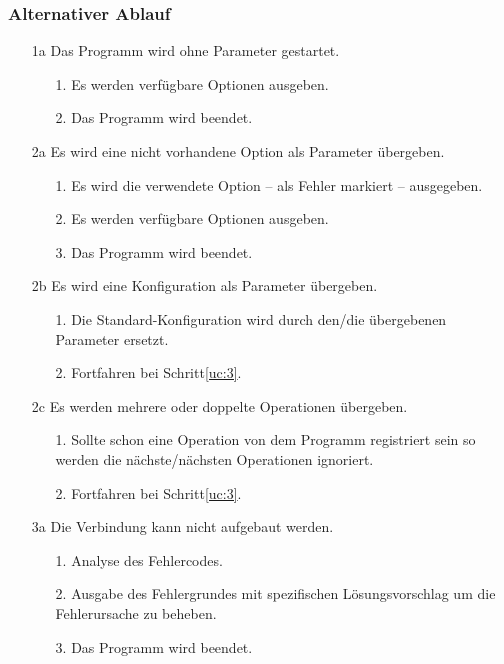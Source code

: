 \documentclass[Bachelorarbeit.tex]{subfiles}
\begin{document}
\subsubsection*{Alternativer Ablauf }
\begin{enumerate} %
\item[1a] Das Programm wird ohne Parameter gestartet.
\begin{enumerate}
\itemsep0em
\item[1.] Es werden verfügbare Optionen ausgeben.
\item[2.] Das Programm wird beendet.
\end{enumerate}
%
\item[2a] Es wird eine nicht vorhandene Option als Parameter übergeben.
\begin{enumerate}
\itemsep0em
\item[1.] Es wird die verwendete Option – als Fehler markiert – ausgegeben.
\item[2.] Es werden verfügbare Optionen ausgeben.
\item[3.] Das Programm wird beendet.
\end{enumerate}
%
\item[2b] Es wird eine Konfiguration als Parameter übergeben.
\begin{enumerate}
\itemsep0em
\item[1.] Die Standard-Konfiguration wird durch den/die übergebenen Parameter 
ersetzt.
\item[2.] Fortfahren bei Schritt\ref{uc:3}.
\end{enumerate}
%
\item[2c] Es werden mehrere oder doppelte Operationen übergeben.
\begin{enumerate}
\itemsep0em
\item[1.] Sollte schon eine Operation von dem Programm registriert sein so werden 
die nächste/nächsten Operationen ignoriert.
\item[2.] Fortfahren bei Schritt\ref{uc:3}.
\end{enumerate}
%
\item[3a] Die Verbindung kann nicht aufgebaut werden.
\begin{enumerate}
\itemsep0em
\item[1.] Analyse des Fehlercodes.
\item[2.] Ausgabe des Fehlergrundes mit spezifischen Lösungsvorschlag um die 
Fehlerursache zu beheben.
\item[3.] Das Programm wird beendet.
\end{enumerate}

\end{enumerate}
\end{document}
